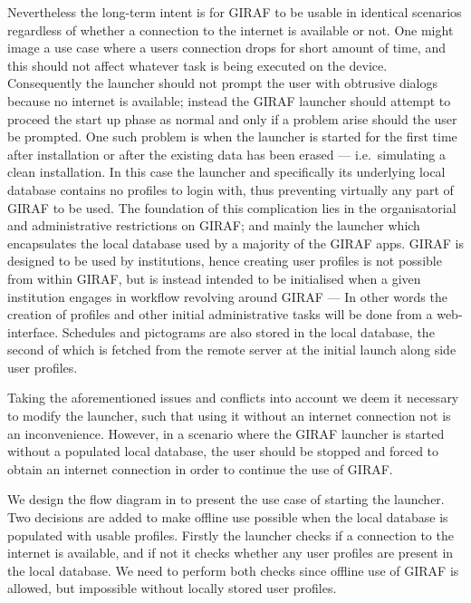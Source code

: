 Nevertheless the long-term intent is for GIRAF to be usable in identical scenarios regardless of whether a connection to the internet is available or not.
One might image a use case where a users connection drops for short amount of time, and this should not affect whatever task is being executed on the device.
Consequently the launcher should not prompt the user with obtrusive dialogs because no internet is available; instead the GIRAF launcher should attempt to proceed the start up phase as normal and only if a problem arise should the user be prompted.
One such problem is when the launcher is started for the first time after installation or after the existing data has been erased --- i.e.\ simulating a clean installation. 
In this case the launcher and specifically its underlying local database contains no profiles to login with, thus preventing virtually any part of GIRAF to be used.
The foundation of this complication lies in the organisatorial and administrative restrictions on GIRAF; and mainly the launcher which encapsulates the local database used by a majority of the GIRAF apps.
GIRAF is designed to be used by institutions, hence creating user profiles is not possible from within GIRAF, but is instead intended to be initialised when a given institution engages in workflow revolving around GIRAF --- In other words the creation of profiles and other initial administrative tasks will be done from a web-interface.
Schedules and pictograms are also stored in the local database, the second of which is fetched from the remote server at the initial launch along side user profiles.

\bigskip

Taking the aforementioned issues and conflicts into account we deem it necessary to modify the launcher, such that using it without an internet connection not is an inconvenience.
However, in a scenario where the GIRAF launcher is started without a populated local database, the user should be stopped and forced to obtain an internet connection in order to continue the use of GIRAF.

We design the flow diagram in  to present the use case of starting the launcher.
Two decisions are added to make offline use possible when the local database is populated with usable profiles.
Firstly the launcher checks if a connection to the internet is available, and if not it checks whether any user profiles are present in the local database.
We need to perform both checks since offline use of GIRAF is allowed, but impossible without locally stored user profiles.

